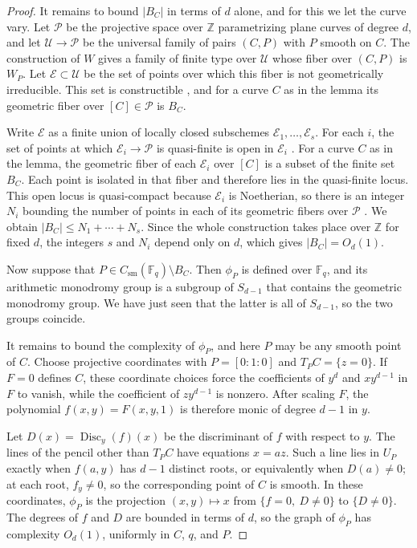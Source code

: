 \documentclass[10pt,a4paper]{amsart}
\theoremstyle{definition}
\theoremstyle{remark}
\newcommand{\Fq}{\mathbb{F}_q}
\begin{document}
\begin{proof}
It remains to bound $|B_C|$ in terms of $d$ alone, and for this we let the curve vary. Let $\mathcal P$ be the projective space over $\mathbb Z$ parametrizing plane curves of degree $d$, and let $\mathcal U\to\mathcal P$ be the universal family of pairs $(C,P)$ with $P$ smooth on $C$. The construction of $W$ gives a family of finite type over $\mathcal U$ whose fiber over $(C,P)$ is $W_P$. Let $\mathcal E\subset\mathcal U$ be the set of points over which this fiber is not geometrically irreducible. This set is constructible \cite[Tag~055B]{Stacks}, and for a curve $C$ as in the lemma its geometric fiber over $[C]\in\mathcal P$ is $B_C$.

Write $\mathcal E$ as a finite union of locally closed subschemes $\mathcal E_1,\ldots,\mathcal E_s$. For each $i$, the set of points at which $\mathcal E_i\to\mathcal P$ is quasi-finite is open in $\mathcal E_i$ \cite[Tag~01TI]{Stacks}. For a curve $C$ as in the lemma, the geometric fiber of each $\mathcal E_i$ over $[C]$ is a subset of the finite set $B_C$. Each point is isolated in that fiber and therefore lies in the quasi-finite locus. This open locus is quasi-compact because $\mathcal E_i$ is Noetherian, so there is an integer $N_i$ bounding the number of points in each of its geometric fibers over $\mathcal P$ \cite[Tag~03JA]{Stacks}. We obtain $|B_C|\leq N_1+\cdots+N_s$. Since the whole construction takes place over $\mathbb Z$ for fixed $d$, the integers $s$ and $N_i$ depend only on $d$, which gives $|B_C|=O_d(1)$.

Now suppose that $P\in C_{\mathrm{sm}}(\Fq)\setminus B_C$. Then $\phi_P$ is defined over $\Fq$, and its arithmetic monodromy group is a subgroup of $S_{d-1}$ that contains the geometric monodromy group. We have just seen that the latter is all of $S_{d-1}$, so the two groups coincide.

It remains to bound the complexity of $\phi_P$, and here $P$ may be any smooth point of $C$. Choose projective coordinates with $P=[0:1:0]$ and $T_PC=\{z=0\}$. If $F=0$ defines $C$, these coordinate choices force the coefficients of $y^d$ and $xy^{d-1}$ in $F$ to vanish, while the coefficient of $zy^{d-1}$ is nonzero. After scaling $F$, the polynomial $f(x,y)=F(x,y,1)$ is therefore monic of degree $d-1$ in $y$.

Let $D(x)=\operatorname{Disc}_y(f)(x)$ be the discriminant of $f$ with respect to $y$. The lines of the pencil other than $T_PC$ have equations $x=az$. Such a line lies in $U_P$ exactly when $f(a,y)$ has $d-1$ distinct roots, or equivalently when $D(a)\neq0$; at each root, $f_y\neq0$, so the corresponding point of $C$ is smooth. In these coordinates, $\phi_P$ is the projection $(x,y)\mapsto x$ from $\{f=0,\ D\neq0\}$ to $\{D\neq0\}$. The degrees of $f$ and $D$ are bounded in terms of $d$, so the graph of $\phi_P$ has complexity $O_d(1)$, uniformly in $C$, $q$, and $P$.
\end{proof}
\end{document}
